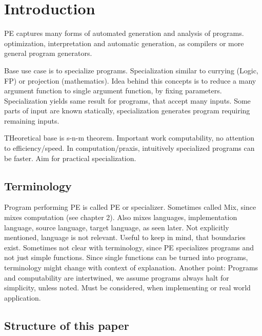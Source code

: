 
\section{Introduction}\label{sec:introduction}

PE captures many forms of automated generation and analysis of programs.
optimization, interpretation and automatic generation, as compilers or more general program generators.

Base use case is to specialize programs.
Specialization similar to currying (Logic, FP) or projection (mathematics).
Idea behind this concepts is to reduce a many argument function to single argument function, by fixing parameters.
Specialization yields same result for programs, that accept many inputs.
Some parts of input are known statically, specialization generates program requiring remaining inputs.

THeoretical base is s-n-m theorem\citationneeded[Kleene].
Important work computability, no attention to efficiency/speed.
In computation/praxis, intuitively specialized programs can be faster.
Aim for practical specialization.

\subsection{Terminology}

Program performing PE is called PE or specializer.
Sometimes called Mix, since mixes computation (see chapter 2).
Also mixes languages, implementation language, source language, target language, as seen later.
Not explicitly mentioned, language is not relevant. Useful to keep in mind, that boundaries exist.
Sometimes not clear with terminology, since PE specializes programs and not just simple functions.
Since single functions can be turned into programs, terminology might change with context of explanation.
Another point: Programs and computability are intertwined, we assume programs always halt for simplicity, unless noted.
Must be considered, when implementing or real world application.

\subsection{Structure of this paper}




